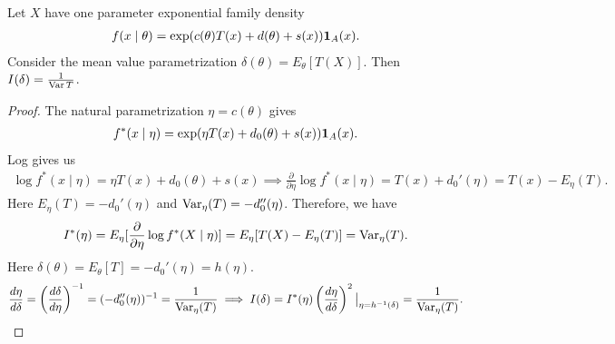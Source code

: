 \begin{theorem}
    Let $X$ have one parameter exponential family density
    \begin{align}
        f(x \mid \theta) = \exp(c(\theta)T(x) + d(\theta) + s(x))\textbf{1}_{A}(x).
    \end{align}
    Consider the mean value parametrization $\delta(\theta) = E_{\theta}[T(X)]$. Then $I(\delta) = \frac{1}{\operatorname{Var} T}$.
\end{theorem}
\begin{proof}
    The natural parametrization $\eta = c(\theta)$ gives
    \begin{align}
        f^{\ast}(x \mid \eta) = \exp(\eta T(x) + d_{0}(\theta)+s(x))\textbf{1}_{A}(x).
    \end{align}
    Log gives us
    \begin{align}
        \log f^{\ast}(x \mid \eta) = \eta T(x) + d_{0}(\theta)+s(x) \implies \frac{\partial}{\partial \eta} \log f^{\ast}(x \mid \eta) = T(x)+d_{0}'(\eta) = T(x)-E_{\eta}(T).
    \end{align}
    Here $E_{\eta}(T) = -d_{0}'(\eta)$ and $\operatorname{Var}_{\eta}(T) = -d_{0}''(\eta)$. Therefore, we have
    \begin{align}
        I^{\ast}(\eta) = E_{\eta} [\frac{\partial}{\partial \eta} \log f^{\ast}(X \mid \eta)] = E_{\eta}[T(X)-E_{\eta}(T)] = \operatorname{Var}_{\eta}(T).
    \end{align}
    Here $\delta(\theta) = E_{\theta}[T] = -d_{0}'(\eta) = h(\eta)$.
    \begin{align}
        \frac{d \eta}{d \delta} = \left( \frac{d \delta}{d \eta} \right)^{-1} = (-d_{0}''(\eta))^{-1} = \frac{1}{\operatorname{Var}_{\eta}(T)} \implies I(\delta) = I^{\ast}(\eta) \left( \frac{d \eta}{d \delta} \right)^{2}\big|_{\eta = h^{-1}(\delta)} = \frac{1}{\operatorname{Var}_{\eta}(T)}.
    \end{align}
\end{proof}


